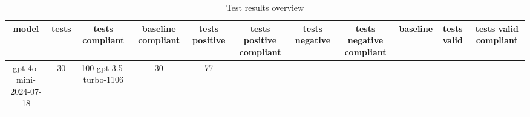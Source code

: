 
  \begin{table}[h!]
  \centering
  \begin{tabular}{|c|c|c|c|c|c|c|c|c|c|c|}
  \hline
  model & tests & tests compliant & baseline compliant & tests positive & tests positive compliant & tests negative & tests negative compliant & baseline & tests valid & tests valid compliant \\
  \hline
  gpt-4o-mini-2024-07-18 & 30 & 100%
\hline
gpt-3.5-turbo-1106 & 30 & 77%
  \end{tabular}
  \caption{Test results overview}
  
  \end{table}
  